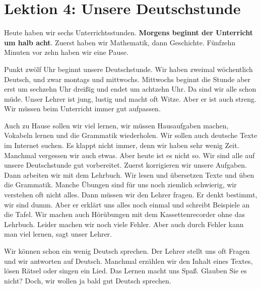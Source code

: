 \chapter{Lektion 4: Unsere Deutschstunde}\label{NJ:chap_N1_L4}

  Heute haben wir sechs Unterrichtsstunden. \textbf{Morgens beginnt der Unterricht um halb acht}. 
  Zuerst haben wir Mathematik, dann Geschichte. Fünfzehn Minuten vor zehn haben wir eine Pause.
  
  Punkt zwölf Uhr beginnt unsere Deutschstunde. Wir haben zweimal wöchentlich Deutsch, und zwar 
  montags und mittwochs. Mittwochs beginnt die Stunde aber erst um sechzehn Uhr dreißig und endet 
  um achtzehn Uhr. Da sind wir alle schon müde. Unser Lehrer ist jung, lustig und macht oft Witze. 
  Aber er ist auch streng. Wir müssen beim Unterricht immer gut aufpassen.
  
  Auch zu Hause sollen wir viel lernen, wir müssen Hausaufgaben machen, Vokabeln lernen und die 
  Grammatik wiederholen. Wir sollen auch deutsche Texte im Internet suchen. Es klappt nicht immer, 
  denn wir haben sehr wenig Zeit. Manchmal vergessen wir auch etwas. Aber heute ist es nicht so. 
  Wir sind alle auf unsere Deutschstunde gut vorbereitet. Zuerst korrigieren wir unsere Aufgaben. 
  Dann arbeiten wir mit dem Lehrbuch. Wir lesen und übersetzen Texte und üben die Grammatik. 
  Manche Übungen sind für uns noch ziemlich schwierig, wir verstehen oft nicht alles. Dann müssen 
  wir den Lehrer fragen. Er denkt bestimmt, wir sind dumm. Aber er erklärt uns alles noch einmal 
  und schreibt Beispiele an die Tafel. Wir machen auch Hörübungen mit dem Kassettenrecorder ohne 
  das Lehrbuch. Leider machen wir noch viele Fehler. Aber auch durch Fehler kann man viel lernen, 
  sagt unser Lehrer.
  
  Wir können schon ein wenig Deutsch sprechen. Der Lehrer stellt uns oft Fragen und wir antworten 
  auf Deutsch. Manchmal erzählen wir den Inhalt eines Textes, lösen Rätsel oder singen ein Lied. 
  Das Lernen macht uns Spaß. Glauben Sie es nicht? Doch, wir wollen ja bald gut Deutsch sprechen.
  
